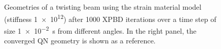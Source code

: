 \begin{figure}[tb]
    \caption{Geometries of a twisting beam using the strain material model (stiffness \num{1e12}) after 1000 XPBD iterations over a time step of size \SI{1e-2}{\second} 
    from different angles. In the right panel, the converged QN geometry is shown as a reference.}
    \label{fig:twisting-beam-xpbd-failure-geometry}
\end{figure}

